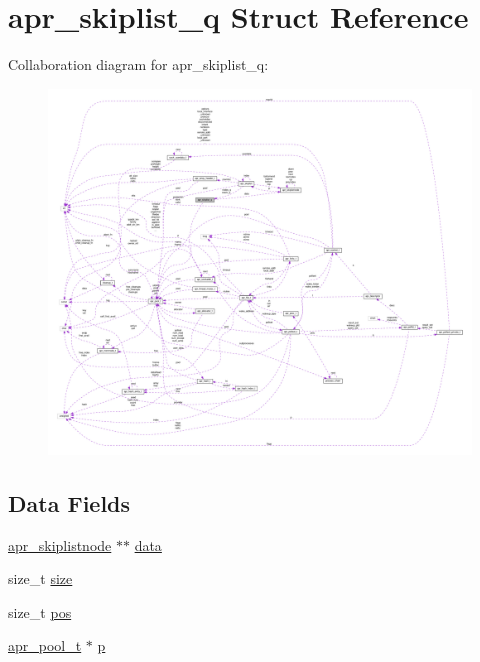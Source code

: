 \hypertarget{structapr__skiplist__q}{}\section{apr\+\_\+skiplist\+\_\+q Struct Reference}
\label{structapr__skiplist__q}


Collaboration diagram for apr\+\_\+skiplist\+\_\+q\+:
\nopagebreak
\begin{figure}[H]
\begin{center}
\leavevmode
\includegraphics[width=350pt]{structapr__skiplist__q__coll__graph}
\end{center}
\end{figure}
\subsection*{Data Fields}
\begin{DoxyCompactItemize}
\item 
\hyperlink{structapr__skiplistnode}{apr\+\_\+skiplistnode} $\ast$$\ast$ \hyperlink{structapr__skiplist__q_a7800b2a0b2813b7588f37cbc70e6cae9}{data}
\item 
size\+\_\+t \hyperlink{structapr__skiplist__q_ae40316b51ae2fcce912d94300b03eb38}{size}
\item 
size\+\_\+t \hyperlink{structapr__skiplist__q_a0a64c71c8598ec26ef95122a83d74da2}{pos}
\item 
\hyperlink{structapr__pool__t}{apr\+\_\+pool\+\_\+t} $\ast$ \hyperlink{structapr__skiplist__q_a3d307b77b55df9859a2d8b169fbdf2f6}{p}
\end{DoxyCompactItemize}


